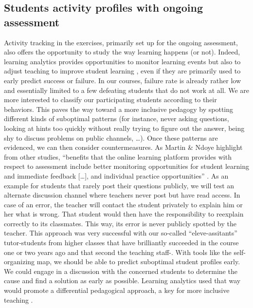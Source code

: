 \documentclass{aims}
\theoremstyle{definition}
\begin{document}
\hypertarget{students-activity-profiles-with-ongoing-assessment-2}{%
\subsection{Students activity profiles with ongoing
assessment}\label{students-activity-profiles-with-ongoing-assessment-2}}

Activity tracking in the exercises, primarily set up for the ongoing
assessment, also offers the opportunity to study the way learning
happens (or not). Indeed, learning analytics provides opportunities to
monitor learning events but also to adjust teaching to improve student
learning \cite{Martin2016, Romero2020}, even if they are primarily used
to early predict success or failure. In our courses, failure rate is
already rather low and essentially limited to a few defeating students
that do not work at all. We are more interested to classify our
participating students according to their behaviors. This paves the way
toward a more inclusive pedagogy by spotting different kinds of
suboptimal patterns (for instance, never asking questions, looking at
hints too quickly without really trying to figure out the answer, being
shy to discuss problems on public channels, \ldots). Once these patterns
are evidenced, we can then consider countermeasures. As Martin \& Ndoye
highlight from other studies, ``benefits that the online learning
platform provides with respect to assessment include better monitoring
opportunities for student learning and immediate feedback {[}\ldots{]},
and individual practice opportunities'' \cite{Martin2016}. As an example
for students that rarely post their questions publicly, we will test an
alternate discussion channel where teachers never post but have read
access. In case of an error, the teacher will contact the student
privately to explain him or her what is wrong. That student would then
have the responsibility to reexplain correctly to its classmates. This
way, its error is never publicly spotted by the teacher. This approach
was very successful with our so-called ``eleve-assitants''
tutor-students from higher classes that have brilliantly succeeded in
the course one or two years ago and that second the teaching staff-.
With tools like the self-organizing map, we should be able to predict
suboptimal student profiles early. We could engage in a discussion with
the concerned students to determine the cause and find a solution as
early as possible. Learning analytics used that way would promote a
differential pedagogical approach, a key for more inclusive teaching
\cite{Siemens2013}.
\end{document}
